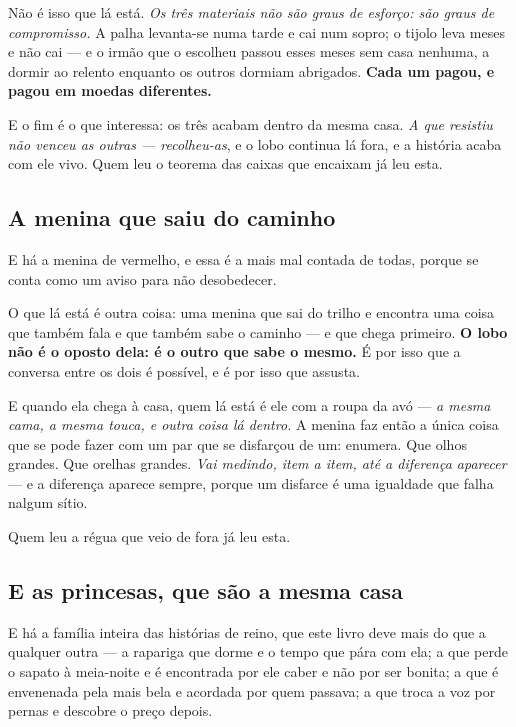 \documentclass[livro.tex]{subfiles}
\begin{document}
Não é isso que lá está. \emph{Os três materiais não são graus de esforço: são graus de
compromisso.} A palha levanta-se numa tarde e cai num sopro; o tijolo leva meses e não cai --- e o
irmão que o escolheu passou esses meses sem casa nenhuma, a dormir ao relento enquanto os outros
dormiam abrigados. \textbf{Cada um pagou, e pagou em moedas diferentes.}

\medskip

E o fim é o que interessa: os três acabam dentro da mesma casa. \emph{A que resistiu não venceu as
outras --- recolheu-as}, e o lobo continua lá fora, e a história acaba com ele vivo. Quem leu o
teorema das caixas que encaixam já leu esta.

\subsection*{A menina que saiu do caminho}

E há a menina de vermelho, e essa é a mais mal contada de todas, porque se conta como um aviso
para não desobedecer.

\medskip

O que lá está é outra coisa: uma menina que sai do trilho e encontra uma coisa que também fala e
que também sabe o caminho --- e que chega primeiro. \textbf{O lobo não é o oposto dela: é o outro
que sabe o mesmo.} É por isso que a conversa entre os dois é possível, e é por isso que assusta.

\medskip

E quando ela chega à casa, quem lá está é ele com a roupa da avó --- \emph{a mesma cama, a mesma
touca, e outra coisa lá dentro.} A menina faz então a única coisa que se pode fazer com um par
que se disfarçou de um: enumera. Que olhos grandes. Que orelhas grandes. \emph{Vai medindo, item a
item, até a diferença aparecer} --- e a diferença aparece sempre, porque um disfarce é uma
igualdade que falha nalgum sítio.

\medskip

Quem leu a régua que veio de fora já leu esta.

\subsection*{E as princesas, que são a mesma casa}

E há a família inteira das histórias de reino, que este livro deve mais do que a qualquer outra
--- a rapariga que dorme e o tempo que pára com ela; a que perde o sapato à meia-noite e é
encontrada por ele caber e não por ser bonita; a que é envenenada pela mais bela e acordada por
quem passava; a que troca a voz por pernas e descobre o preço depois.
\end{document}
